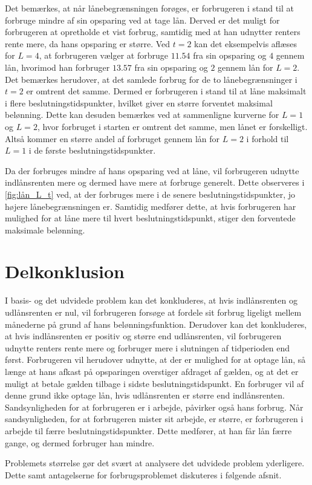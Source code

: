 Det bemærkes, at når lånebegrænsningen forøges, er forbrugeren i stand til at forbruge mindre af sin opsparing ved at tage lån. Derved er det muligt for forbrugeren at opretholde et vist forbrug, samtidig med at han udnytter renters rente mere, da hans opsparing er større. Ved $t=2$ kan det eksempelvis aflæses for $L=4$, at forbrugeren vælger at forbruge $11.54$ fra sin opsparing og $4$ gennem lån, hvorimod han forbruger $13.57$ fra sin opsparing og $2$ gennem lån for $L=2$. Det bemærkes herudover, at det samlede forbrug for de to lånebegrænsninger i $t=2$ er omtrent det samme. Dermed er forbrugeren i stand til at låne maksimalt i flere beslutningstidspunkter, hvilket giver en større forventet maksimal belønning. Dette kan desuden bemærkes ved at sammenligne kurverne for $L=1$ og $L=2$, hvor forbruget i starten er omtrent det samme, men lånet er forskelligt. Altså kommer en større andel af forbruget gennem lån for $L=2$ i forhold til $L=1$ i de første beslutningstidspunkter.

Da der forbruges mindre af hans opsparing ved at låne, vil forbrugeren udnytte indlånsrenten mere og dermed have mere at forbruge generelt. Dette observeres i \autoref{fig:lån_L_t} ved, at der forbruges mere i de senere beslutningstidspunkter, jo højere lånebegrænsningen er. Samtidig medfører dette, at hvis forbrugeren har mulighed for at låne mere til hvert beslutningstidspunkt, stiger den forventede maksimale belønning. 

\section{Delkonklusion}
I basis- og det udvidede problem kan det konkluderes, at hvis indlånsrenten og udlånsrenten er nul, vil forbrugeren forsøge at fordele sit forbrug ligeligt mellem månederne på grund af hans belønningsfunktion. Derudover kan det konkluderes, at hvis indlånsrenten er positiv og større end udlånsrenten, vil forbrugeren udnytte renters rente mere og forbruger mere i slutningen af tidperioden end først. Forbrugeren vil herudover udnytte, at der er mulighed for at optage lån, så længe at hans afkast på opsparingen overstiger afdraget af gælden, og at det er muligt at betale gælden tilbage i sidste beslutningstidspunkt. En forbruger vil af denne grund ikke optage lån, hvis udlånsrenten er større end indlånsrenten. Sandsynligheden for at forbrugeren er i arbejde, påvirker også hans forbrug. Når sandsynligheden, for at forbrugeren mister sit arbejde, er større, er forbrugeren i arbejde til færre beslutningstidspunkter. Dette medfører, at han får lån færre gange, og dermed forbruger han mindre.

Problemets størrelse gør det svært at analysere det udvidede problem yderligere. Dette samt antagelserne for forbrugsproblemet diskuteres i følgende afsnit. 











